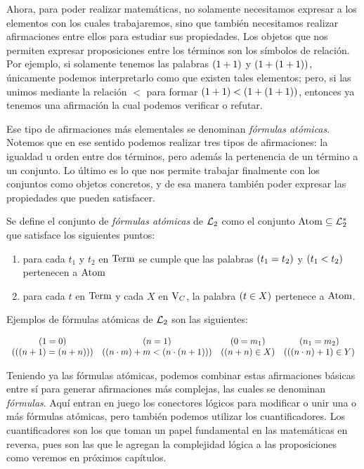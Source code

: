 Ahora, para poder realizar matemáticas, no solamente necesitamos expresar a los elementos con los cuales trabajaremos, sino que también necesitamos realizar afirmaciones entre ellos para estudiar sus propiedades. Los objetos que nos permiten expresar proposiciones entre los términos son los símbolos de relación. Por ejemplo, si solamente tenemos las palabras $\pa*{1 + 1}$ y $\pa*{1 +\pa*{1 + 1}}$, únicamente podemos interpretarlo como que existen tales elementos; pero, si las unimos mediante la relación $<$ para formar $\pa*{1 + 1}<\pa*{1 +\pa*{1 + 1}}$, entonces ya tenemos una afirmación la cual podemos verificar o refutar. 

Ese tipo de afirmaciones más elementales se denominan \emph{fórmulas atómicas}. Notemos que en ese sentido podemos realizar tres tipos de afirmaciones: la igualdad u orden entre dos términos, pero además la pertenencia de un término a un conjunto. Lo último es lo que nos permite trabajar finalmente con los conjuntos como objetos concretos, y de esa manera también poder expresar las propiedades que pueden satisfacer.

\begin{definition}
	Se define el conjunto de \emph{fórmulas atómicas} de $\ARITMETICA$ como el conjunto $\ATOMICAS\subseteq\ARITMETICA^{*}$ que satisface los siguientes puntos:

	\begin{enumerate}
		\item para cada $t_{1}$ y $t_{2}$ en $\TERMINOS$ se cumple que las palabras $\pa*{t_{1} = t_{2}}$ y $\pa*{t_{1} < t_{2}}$ pertenecen a $\ATOMICAS$
		\item para cada $t$ en $\TERMINOS$ y cada $X$ en $\VARIABLES[C]$, la palabra $\pa*{t\in X}$ pertenece a $\ATOMICAS$.
	\end{enumerate}
\end{definition}

Ejemplos de fórmulas atómicas de $\ARITMETICA$ son las siguientes:

\[
	\begin{array}{cccc}
		\pa*{1 = 0} &\pa*{n = 1} &\pa*{0 = m_{1}} &\pa*{n_{1} = m_{2}}\\
		\pa*{\pa*{\pa*{n + 1}=\pa*{n + n}}} &\pa*{\pa*{n\cdot m} + m <\pa*{n\cdot\pa*{n + 1}}} &\pa*{\pa*{n + n}\in X} &\pa*{\pa*{\pa*{n\cdot n} + 1}\in Y}
	\end{array}
\]

Teniendo ya las fórmulas atómicas, podemos combinar estas afirmaciones básicas entre sí para generar afirmaciones más complejas, las cuales se denominan \emph{fórmulas}. Aquí entran en juego los conectores lógicos para modificar o unir una o más fórmulas atómicas, pero también podemos utilizar los cuantificadores. Los cuantificadores son los que toman un papel fundamental en las matemáticas en reversa, pues son las que le agregan la complejidad lógica a las proposiciones como veremos en próximos capítulos.

